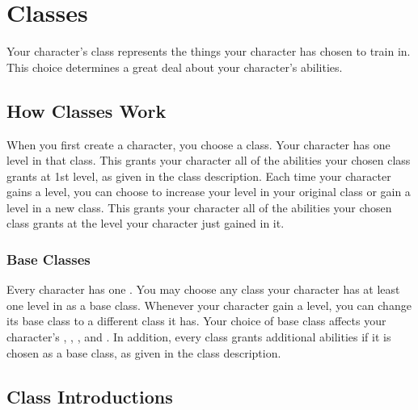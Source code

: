 \chapter{Classes}\label{Classes}

Your character's class represents the things your character has chosen to train in.
This choice determines a great deal about your character's abilities.

\section{How Classes Work}
    When you first create a character, you choose a class.
    Your character has one level in that class.
    This grants your character all of the abilities your chosen class grants at 1st level, as given in the class description.
    Each time your character gains a level, you can choose to increase your level in your original class or gain a level in a new class.
    This grants your character all of the abilities your chosen class grants at the level your character just gained in it.

    \subsection{Base Classes}
        Every character has one .
        You may choose any class your character has at least one level in as a base class.
        Whenever your character gain a level, you can change its base class to a different class it has.
        Your choice of base class affects your character's , , , and .
        In addition, every class grants additional abilities if it is chosen as a base class, as given in the class description.

\section{Class Introductions}

